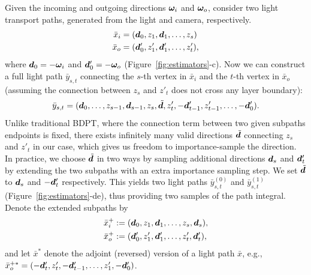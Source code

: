 Given the incoming and outgoing directions $\bm{\omega}_i$ and $\bm{\omega}_o$, consider two light transport paths, generated from the light and camera, respectively.
%
\begin{equation}
\begin{aligned}
\bar{x}_i &= (\bm{d}_0, z_1, \bm{d}_1, \ldots, z_s) \\
\bar{x}_o &= (\bm{d}'_0, z'_1, \bm{d}'_1, \ldots, z_t'),
\end{aligned}
\end{equation}
%
where $\bm{d}_0 = -\bm{\omega}_i$ and $\bm{d}'_0 = -\bm{\omega}_o$ (Figure~\ref{fig:estimators}-c).
Now we can construct a full light path $\bar{y}_{s, t}$ connecting the $s$-th vertex in $\bar{x}_i$ and the $t$-th vertex in $\bar{x}_o$ (assuming the connection between $z_s$ and $z'_t$ does not cross any layer boundary):
%
\begin{equation}
\bar{y}_{s, t} = (\bm{d}_0, \ldots, z_{s - 1}, \bm{d}_{s - 1}, z_s, \tilde{\bm{d}}, z'_t, -\bm{d}'_{t - 1}, z'_{t - 1}, \ldots, -\bm{d}'_0).
\end{equation}
%
Unlike traditional BDPT, where the connection term between two given subpaths endpoints is fixed, there exists infinitely many valid directions $\tilde{\bm{d}}$ connecting $z_s$ and $z'_t$ in our case, which gives us freedom to importance-sample the direction. In practice, we choose $\tilde{\bm{d}}$ in two ways by sampling additional directions $\bm{d}_s$ and $\bm{d}'_t$ by extending the two subpaths with an extra importance sampling step. We set $\tilde{\bm{d}}$ to $\bm{d}_s$ and $-\bm{d}'_t$ respectively. This yields two light paths $\bar{y}^{(0)}_{s, t}$ and $\bar{y}^{(1)}_{s, t}$ (Figure~\ref{fig:estimators}-de), thus providing two samples of the path integral.
Denote the extended subpaths by
%
\begin{align}
\bar{x}_i^+ &:= (\bm{d}_0, z_1, \bm{d}_1, \ldots, z_s, \bm{d}_s),\\
\bar{x}_o^+ &:= (\bm{d}'_0, z'_1, \bm{d}'_1, \ldots, z'_t, \bm{d}'_t),
\end{align}
%
and let $\bar{x}^*$ denote the adjoint (reversed) version of a light path $\bar{x}$, e.g., $\bar{x}_o^{+*} = (-\bm{d}'_t, z'_t, -\bm{d}'_{t - 1}, \ldots, z'_1, -\bm{d}'_0)$.

